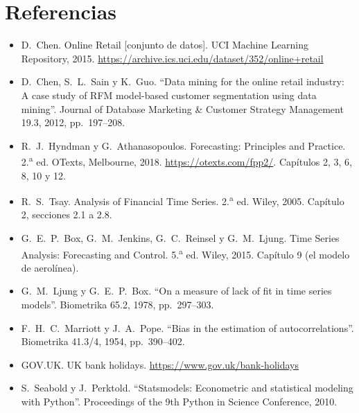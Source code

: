 \documentclass[11pt]{article}
\begin{document}
\section*{Referencias}

\begin{itemize}
\item D.~Chen. Online Retail [conjunto de datos]. UCI Machine Learning Repository, 2015. \url{https://archive.ics.uci.edu/dataset/352/online+retail}

\item D.~Chen, S.~L.~Sain y K.~Guo. ``Data mining for the online retail industry: A case study of RFM model-based customer segmentation using data mining''. Journal of Database Marketing \& Customer Strategy Management 19.3, 2012, pp.~197--208.

\item R.~J.~Hyndman y G.~Athanasopoulos. Forecasting: Principles and Practice. 2.\textsuperscript{a} ed. OTexts, Melbourne, 2018. \url{https://otexts.com/fpp2/}. Capítulos 2, 3, 6, 8, 10 y 12.

\item R.~S.~Tsay. Analysis of Financial Time Series. 2.\textsuperscript{a} ed. Wiley, 2005. Capítulo 2, secciones 2.1 a 2.8.

\item G.~E.~P.~Box, G.~M.~Jenkins, G.~C.~Reinsel y G.~M.~Ljung. Time Series Analysis: Forecasting and Control. 5.\textsuperscript{a} ed. Wiley, 2015. Capítulo 9 (el modelo de aerolínea).

\item G.~M.~Ljung y G.~E.~P.~Box. ``On a measure of lack of fit in time series models''. Biometrika 65.2, 1978, pp.~297--303.

\item F.~H.~C.~Marriott y J.~A.~Pope. ``Bias in the estimation of autocorrelations''. Biometrika 41.3/4, 1954, pp.~390--402.

\item GOV.UK. UK bank holidays. \url{https://www.gov.uk/bank-holidays}

\item S.~Seabold y J.~Perktold. ``Statsmodels: Econometric and statistical modeling with Python''. Proceedings of the 9th Python in Science Conference, 2010.
\end{itemize}
\end{document}
